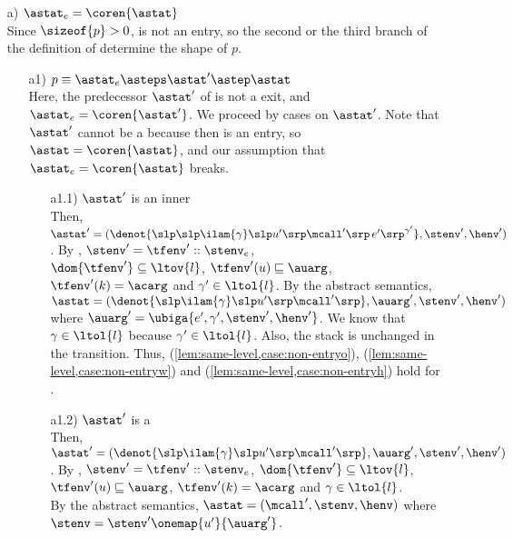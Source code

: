 \documentclass{LMCS}
\theoremstyle{definition} \newtheorem{property}[thm]{Property}
\begin{document}
\begin{enumerate}[$\bullet$]
\item[a)]
  $\entry = \coren{\astat}$ \\
  Since $\sizeof{p} > 0$, \astat{} is not an entry, so the second or the
  third branch of the definition of \dcoren{} determine the shape of $p$.
  \begin{enumerate}[$\bullet$]
  \item[a1)]
    $p \equiv \entry \asteps \astat' \astep \astat$ \\
    Here, the predecessor $\astat'$ of \astat{} is not a \daceval{} exit,
    and $\entry = \coren{\astat'}$.
    We proceed by cases on $\astat'$.
    Note that $\astat'$ cannot be a \daueval{} 
    because then \astat{} is an entry, so $\astat = \coren{\astat}$,
    and our assumption that $\entry = \coren{\astat}$ breaks.
    \begin{enumerate}[$\bullet$]
    \item[a1.1)]
      $\astat'$ is an inner \daceval \\
      Then, $\astat' =
      (\denot{\slp\slp \ilam{\gamma}\slp u'\srp\mcall'\srp \, e'\srp^{\gamma'}},
      \stenv', \henv')$.
      By \ih, $\stenv' = \tfenv'::\stenv_e$, \\
      $\dom{\tfenv'} \subseteq \ltov{l}$,
      $\tfenv'(u) \sqsubseteq \auarg$,
      $\tfenv'(k) = \acarg$ and
      $\gamma' \in \ltol{l}$.
      By the abstract semantics, $\astat = 
      (\denot{\slp \ilam{\gamma}\slp u'\srp\mcall'\srp}, \auarg', \stenv', 
      \henv')$
      where $\auarg' = \ubiga{e', \gamma', \stenv', \henv'}$.
      We know that $\gamma \in \ltol{l}$ 
      because $\gamma' \in \ltol{l}$.
      Also, the stack is unchanged in the transition.
      Thus, (\ref{lem:same-level,case:non-entryo}),
      (\ref{lem:same-level,case:non-entryw})
      and (\ref{lem:same-level,case:non-entryh})
      hold for \astat.
    \item[a1.2)]
      $\astat'$ is a \dacapply \\
      Then, $\astat' =
      (\denot{\slp \ilam{\gamma}\slp u'\srp\mcall'\srp}, 
      \auarg', \stenv', \henv')$.
      By \ih, $\stenv' = \tfenv'::\stenv_e$,
      $\dom{\tfenv'} \subseteq \ltov{l}$,
      $\tfenv'(u) \sqsubseteq \auarg$,
      $\tfenv'(k) = \acarg$ and
      $\gamma \in \ltol{l}$. \\
      By the abstract semantics, 
      $\astat = (\mcall', \stenv, \henv)$ where 
      $\stenv = \stenv'\onemap{u'}{\auarg'}$. \\

\end{enumerate}
\end{enumerate}
\end{enumerate}
\end{document}
